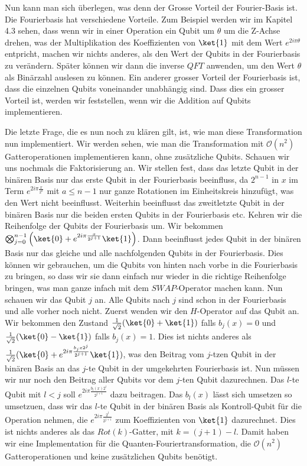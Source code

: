Nun kann man sich überlegen, was denn der Grosse Vorteil der Fourier-Basis ist. Die Fourierbasis hat verschiedene Vorteile. Zum Beispiel werden wir im Kapitel 4.3 sehen, dass wenn wir in einer Operation ein Qubit um $\theta$ um die Z-Achse drehen, was der Multiplikation des Koeffizienten von $\ket{1}$ mit dem Wert $e^{2i\pi\theta}$ entpricht, machen wir nichts anderes, als den Wert der Qubits in der Fourierbasis zu verändern. Später können wir dann die inverse $QFT$ anwenden, um den Wert $\theta$ als Binärzahl auslesen zu können. Ein anderer grosser Vorteil der Fourierbasis ist, dass die einzelnen Qubits voneinander unabhängig sind. Dass dies ein grosser Vorteil ist, werden wir feststellen, wenn wir die Addition auf Qubits implementieren.

Die letzte Frage, die es nun noch zu klären gilt, ist, wie man diese Transformation nun implementiert. Wir werden sehen, wie man die Transformation mit $\mathcal O(n^2)$ Gatteroperationen implementieren kann, ohne zusätzliche Qubits. Schauen wir uns nochmals die Faktorisierung an. Wir stellen fest, dass das letzte Qubit in der binären Basis nur das erste Qubit in der Fourierbasis beeinfluss, da $2^{n - 1}$ in $x$ im Term $e^{2i\pi\frac{x}{2^a}}$ mit $a \leq n - 1$ nur ganze Rotationen im Einheitskreis hinzufügt, was den Wert nicht beeinflusst. Weiterhin beeinflusst das zweitletzte Qubit in der binären Basis nur die beiden ersten Qubits in der Fourierbasis etc. Kehren wir die Reihenfolge der Qubits der Fourierbasis um. Wir bekommen $\bigotimes_{j = 0}^{n - 1}\left(\ket{0} + e^{2i\pi\frac{x}{2^{j + 1}}}\ket{1}\right)$. Dann beeinflusst jedes Qubit in der binären Basis nur das gleiche und alle nachfolgenden Qubits in der Fourierbasis. Dies können wir gebrauchen, um die Qubits von hinten nach vorbe in die Fourierbasis zu bringen, so dass wir sie dann einfach nur wieder in die richtige Reihenfolge bringen, was man ganze infach mit dem $SWAP$-Operator machen kann. Nun schauen wir das Qubit $j$ an. Alle Qubits nach $j$ sind schon in der Fourierbasis und alle vorher noch nicht. Zuerst wenden wir den $H$-Operator auf das Qubit an. Wir bekommen den Zustand $\frac{1}{\sqrt{2}}(\ket{0} + \ket{1})$ falls $b_j(x) = 0$ und $\frac{1}{\sqrt{2}}(\ket{0} - \ket{1})$ falls $b_j(x) = 1$. Dies ist nichts anderes als $\frac{1}{\sqrt{2}}(\ket{0} + e^{2i\pi\frac{b_j{x}2^j}{2^{j + 1}}}\ket{1})$, was den Beitrag vom $j$-tzen Qubit in der binären Basis an das $j$-te Qubit in der umgekehrten Fourierbasis ist. Nun müssen wir nur noch den Beitrag aller Qubits vor dem $j$-ten Qubit dazurechnen. Das $l$-te Qubit mit $l < j$ soll $e^{2i\pi\frac{b_l(x)2^{l}}{2^{j + 1}}}$ dazu beitragen. Das $b_l(x)$ lässt sich umsetzen so umsetzuen, dass wir das $l$-te Qubit in der binären Basis als Kontroll-Qubit für die Operation nehmen, die $e^{2i\pi\frac{2^{l}}{2^{j + 1}}}$ zum Koeffizienten von $\ket{1}$ dazurechnet. Dies ist nichts anderes als das $Rot(k)$-Gatter, mit $k = (j + 1) - l$. Damit haben wir eine Implementation für die Quanten-Fouriertransformation, die $\mathcal O(n^2)$ Gatteroperationen und keine zusätzlichen Qubits benötigt.

